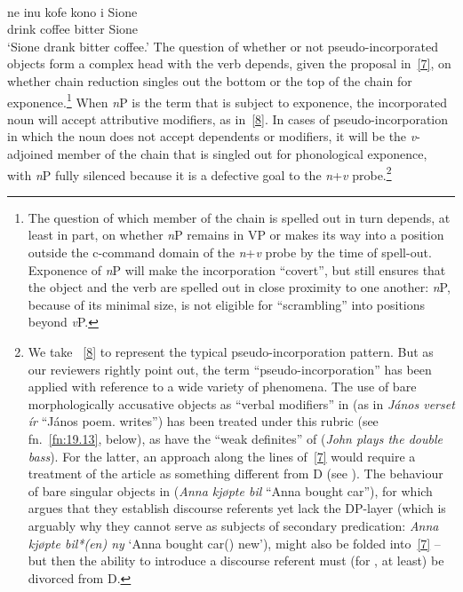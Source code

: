 \documentclass[output=paper]{langsci/langscibook}
\begin{document}
\begin{refcontext}
\ea {}\\
    \gll ne inu kofe kono i Sione \label{8}\\
    \Pst{} drink coffee bitter \Abs{} Sione\\
    \glt \enquote*{Sione drank bitter coffee.}
\z
The question of whether or not pseudo-incorporated objects form a complex head
with the verb depends, given the proposal in~\eqref{7}, on whether chain
reduction singles out the bottom or the top of the chain for
exponence.\footnote{The question of which member of the chain is spelled out in
    turn depends, at least in part, on whether \emph{n}P remains in VP or makes
    its way into a position outside the c-command domain of the
    \emph{n}+\emph{v} probe by the time of spell-out.  Exponence of \emph{n}P
    will make the incorporation \enquote{covert}, but still ensures that the object
    and the verb are spelled out in close proximity to one another: \emph{n}P,
because of its minimal size, is not eligible for \enquote{scrambling} into positions
beyond \emph{v}P.} When \emph{n}P is the term that is subject to exponence, the
incorporated noun will accept attributive modifiers, as in~\eqref{8}. In cases of
pseudo-incorporation in which the noun does not accept dependents or modifiers,
it will be the \emph{v}-adjoined member of the chain that is singled out for
phonological exponence, with \emph{n}P fully silenced because it is a defective
goal to the \emph{n}+\emph{v} probe.\footnote{We take ~\eqref{8} to
    represent the typical pseudo-incorporation pattern. But as our reviewers
    rightly point out, the term \enquote{pseudo-incorporation} has been applied with
    reference to a wide variety of phenomena. The use of bare morphologically
    accusative objects as \enquote{verbal modifiers} in  (as in \emph{János
    verset ír} \enquote{János poem.\Acc{} writes}) has been treated under this
    rubric (see fn.\ \ref{fn:19.13}, below), as have the \enquote{weak definites} of 
    (\emph{John plays the double bass}). For the latter, an approach along the
    lines of~\eqref{7} would require a treatment of the article as something
    different from D (see \citealt{zamparelli}). The behaviour of bare singular
    objects in  (\emph{Anna kj\o{}pte bil} \enquote{Anna bought car}), for
    which \cite{kallullidiss} argues that they establish discourse referents
    yet lack the DP-layer (which is arguably why they cannot serve as subjects
of secondary predication: \emph{Anna kj\o{}pte bil*(en) ny} \enquote*{Anna
bought car(\Def{}) new}), might also be folded into~\eqref{7} -- but then the
ability to introduce a discourse referent must (for , at least) be
divorced from D.\label{fn:19.7}}


\end{refcontext}
\end{document}
